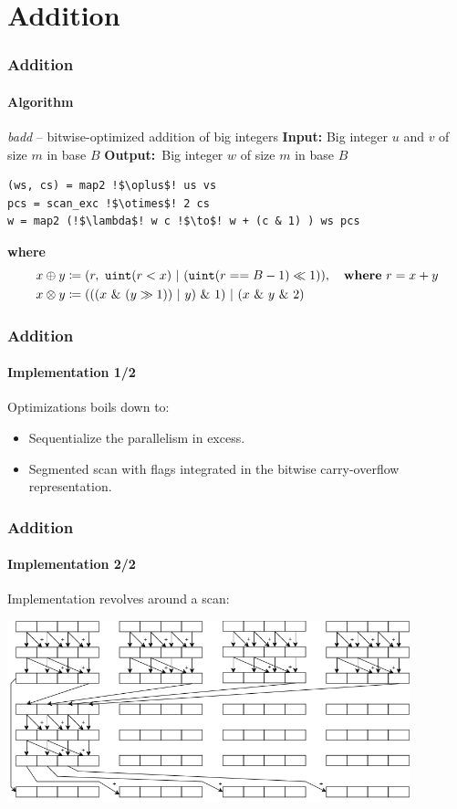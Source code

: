 \section{Addition}
\begin{frame}[fragile]
  \frametitle{Addition}
  \framesubtitle{Algorithm}
  \begin{block}{\textit{badd} -- bitwise-optimized addition of big integers}\scriptsize
    \textbf{Input:} \quad Big integer $u$ and $v$ of size $m$ in base $B$\newline
    \textbf{Output:} \,Big integer $w$ of size $m$ in base $B$\newline
\begin{lstlisting}[language=pseudo,escapeinside=!!,basicstyle=\scriptsize]
(ws, cs) = map2 !$\oplus$! us vs
pcs = scan_exc !$\otimes$! 2 cs
w = map2 (!$\lambda$! w c !$\to$! w + (c & 1) ) ws pcs
\end{lstlisting}\phantom{~}\newline
    \textbf{where}\vspace*{-0.5em}
    \begin{align}
  x \oplus y &\coloneq (r,~\mathtt{uint}(r < x)~|~(\mathtt{uint}(r == B-1) \ll 1)),\quad\textbf{where}~r = x + y \\
  x \otimes y &\coloneq (((x~\&~(y \gg 1))~|~y)~\&~1)~|~(x~\&~y~\&~2)
      \end{align}
  \end{block}
\end{frame}

\begin{frame}[fragile]
  \frametitle{Addition}
  \framesubtitle{Implementation 1/2}
  Optimizations boils down to:
  \begin{itemize}
    \item Sequentialize the parallelism in excess.\pause
    \item Segmented scan with flags integrated in the bitwise carry-overflow representation.
    \end{itemize}
  \end{frame}

\begin{frame}[fragile]
  \frametitle{Addition}
  \framesubtitle{Implementation 2/2}
  Implementation revolves around a scan:
  \begin{center}
    \includegraphics[width=0.875\textwidth]{../thesis/img/warp-level-scan.png}
    \end{center}
\end{frame}

